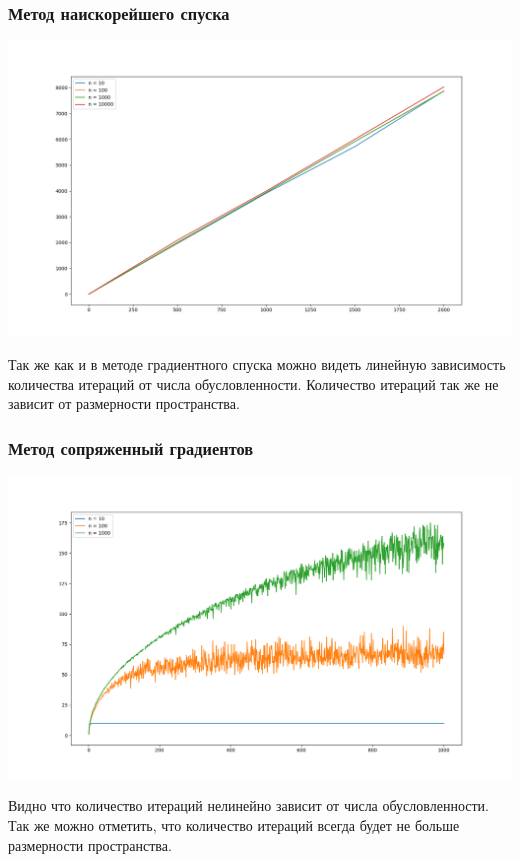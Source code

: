\documentclass[english]{article}
\begin{document}
\subsubsection{Метод наискорейшего спуска}

\begin{center}
    \includegraphics[scale=0.4]{plots/steepest_gradient_1.png}
\end{center} 
Так же как и в методе градиентного
спуска можно видеть линейную зависимость количества итераций от числа
обусловленности. Количество итераций так же не зависит от размерности
пространства.

\subsubsection{Метод сопряженный градиентов}
\begin{center}
    \includegraphics[scale=0.4]{plots/conjugate_gradient_1.png}
\end{center}
Видно что количество итераций нелинейно зависит от числа
обусловленности. Так же можно отметить, что количество итераций всегда
будет не больше размерности пространства.
\end{document}
